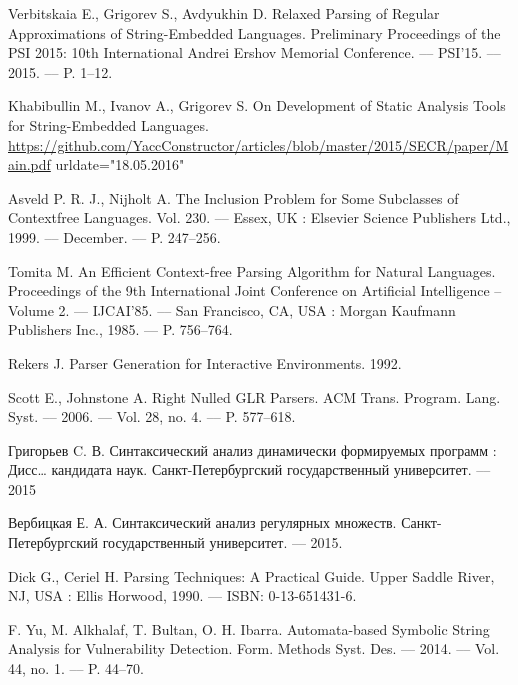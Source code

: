 \begin{thebibliography}{99}
  Verbitskaia E., Grigorev S., Avdyukhin D. 
  Relaxed Parsing of Regular Approximations of String-Embedded Languages. 
  Preliminary Proceedings of the PSI 2015: 10th International Andrei Ershov Memorial Conference. –– PSI’15. –– 2015. –– P. 1–12.

  Khabibullin M., Ivanov A., Grigorev S.
  On Development of Static Analysis Tools for String-Embedded Languages.
  \url{https://github.com/YaccConstructor/articles/blob/master/2015/SECR/paper/Main.pdf}
  urldate="18.05.2016"
                      
  Asveld P. R. J., Nijholt A.
  The Inclusion Problem for Some Subclasses of Contextfree Languages. 
  Vol. 230. –– Essex, UK : Elsevier Science Publishers Ltd., 1999. –– December. –– P. 247–256.

  Tomita M.
  An Efficient Context-free Parsing Algorithm for Natural Languages.
  Proceedings of the 9th International Joint Conference on Artificial Intelligence -- Volume 2. –– IJCAI’85. –– San Francisco, CA, USA : Morgan Kaufmann Publishers Inc., 1985. –– P. 756–764.

  Rekers J.
  Parser Generation for Interactive Environments. 
  1992.

  Scott E., Johnstone A. 
  Right Nulled GLR Parsers.
  ACM Trans. Program. Lang. Syst. –– 2006. –– Vol. 28, no. 4. –– P. 577–618.

  Григорьев C. В.
  Синтаксический анализ динамически формируемых программ : Дисс… кандидата наук.
  Санкт-Петербургский государственный университет. –– 2015 

  Вербицкая Е. А. 
  Синтаксический анализ регулярных множеств.
  Санкт-Петербургский государственный университет. –– 2015.

  Dick G., Ceriel H. 
  Parsing Techniques: A Practical Guide.
  Upper Saddle River, NJ, USA : Ellis Horwood, 1990. –– ISBN: 0-13-651431-6.

  F. Yu, M. Alkhalaf, T. Bultan, O. H. Ibarra.
  Automata-based Symbolic String Analysis for Vulnerability Detection. 
  Form. Methods Syst. Des. –– 2014. –– Vol. 44, no. 1. –– P. 44–70.
\end{thebibliography}
